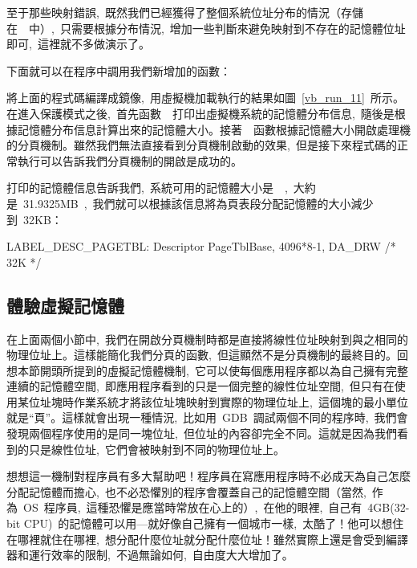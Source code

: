 至于那些映射錯誤,~既然我們已經獲得了整個系統位址分布的情況（存儲在~~中）,~只需要根據分布情況,~增加一些判斷來避免映射到不存在的記憶體位址即可,~這裡就不多做演示了。

下面就可以在程序中調用我們新增加的函數：


將上面的程式碼編譯成鏡像,~用虛擬機加載執行的結果如圖~\ref{vb_run_11}~所示。在進入保護模式之後,~首先函數~~打印出虛擬機系統的記憶體分布信息,~隨後是根據記憶體分布信息計算出來的記憶體大小。接著~~函數根據記憶體大小開啟處理機的分頁機制。雖然我們無法直接看到分頁機制啟動的效果,~但是接下來程式碼的正常執行可以告訴我們分頁機制的開啟是成功的。


打印的記憶體信息告訴我們,~系統可用的記憶體大小是~~,~大約是~31.9325MB~,~我們就可以根據該信息將為頁表段分配記憶體的大小減少到~32KB：

\begin{Command}
LABEL_DESC_PAGETBL: Descriptor PageTblBase,        4096*8-1, DA_DRW /* 32K */
\end{Command}

\subsection{體驗虛擬記憶體}

在上面兩個小節中,~我們在開啟分頁機制時都是直接將線性位址映射到與之相同的物理位址上。這樣能簡化我們分頁的函數,~但這顯然不是分頁機制的最終目的。回想本節開頭所提到的虛擬記憶體機制,~它可以使每個應用程序都以為自己擁有完整連續的記憶體空間,~即應用程序看到的只是一個完整的線性位址空間,~但只有在使用某位址塊時作業系統才將該位址塊映射到實際的物理位址上,~這個塊的最小單位就是“頁”。這樣就會出現一種情況,~比如用~GDB~調試兩個不同的程序時,~我們會發現兩個程序使用的是同一塊位址,~但位址的內容卻完全不同。這就是因為我們看到的只是線性位址,~它們會被映射到不同的物理位址上。

想想這一機制對程序員有多大幫助吧！程序員在寫應用程序時不必成天為自己怎麼分配記憶體而擔心,~也不必恐懼別的程序會覆蓋自己的記憶體空間（當然,~作為~OS~程序員,~這種恐懼是應當時常放在心上的）,~在他的眼裡,~自己有~4GB(32-bit CPU)~的記憶體可以用---就好像自己擁有一個城市一樣,~太酷了！他可以想住在哪裡就住在哪裡,~想分配什麼位址就分配什麼位址！雖然實際上還是會受到編譯器和運行效率的限制,~不過無論如何,~自由度大大增加了。


